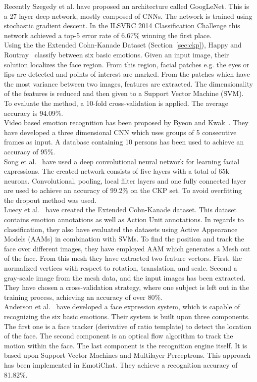 \documentclass[10pt,journal,compsoc, hidelinks]{IEEEtran}
\begin{document}
Recently Szegedy et al.\cite{DBLP:journals/corr/SzegedyLJSRAEVR14} have proposed an architecture called GoogLeNet. This is a 27 layer deep network, mostly composed of CNNs. The network is trained using stochastic gradient descent. In the ILSVRC 2014 Classification Challenge this network achieved a top-5 error rate of 6.67\% winning the first place. \\
Using the the Extended Cohn-Kanade Dataset (Section~\ref{sec:ckp}), Happy and Routray~\cite{6998925} classify between six basic emotions. Given an input image, their solution localizes the face region. From this region, facial patches e.g. the eyes or lips are detected and points of interest are marked. From the patches which have the most variance between two images, features are extracted. The dimensionality of the features is reduced and then given to a Support Vector Machine (SVM). To evaluate the method, a 10-fold cross-validation is applied. 
The average accuracy is 94.09\%.\\
Video based emotion recognition has been proposed by Byeon and Kwak~\cite{byeonfacial}. They have developed a three dimensional CNN which uses groups of 5 consecutive frames as input. A database containing 10 persons has been used to achieve an accuracy of 95\%.\\
Song et al.~\cite{song2014deep} have used a deep convolutional neural network for learning facial expressions. The created network consists of five layers with a total of 65k neurons. Convolutional, pooling, local filter layers and one fully connected layer are used to achieve an accuracy of 99.2\% on the CKP set. To avoid overfitting the dropout method was used.\\
Luecy et al.~\cite{5543262} have created the Extended Cohn-Kanade dataset. This dataset contains emotion annotations as well as Action Unit annotations. In regards to classification, they also have evaluated the datasets using Active Appearance Models (AAMs) in combination with SVMs. To find the position and track the face over different images, they have employed AAM which generates a Mesh out of the face. From this mesh they have extracted two feature vectors. First, the normalized vertices with respect to rotation, translation, and scale. Second a gray-scale image from the mesh data, and the input images has been extracted. They have chosen a cross-validation strategy, where one subject is left out in the training process, achieving an accuracy of over 80\%.\\
Anderson et al.~\cite{Anderson06areal-time} have developed a face expression system, which is capable of recognizing the six basic emotions. Their system is built upon three components. The first one is a face tracker (derivative of ratio template) to detect the location of the face. The second component is an optical flow algorithm to track the motion within the face. The last component is the recognition engine itself. It is based upon Support Vector Machines and Multilayer Perceptrons. This approach has been implemented in EmotiChat. They achieve a recognition accuracy of 81.82\%.\\
\end{document}
